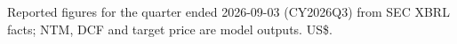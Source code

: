 \label{tab:key-data}
{\footnotesize Reported figures for the quarter ended 2026-09-03 (CY2026Q3) from SEC XBRL facts; NTM, DCF and target price are model outputs. US\$.\par}

